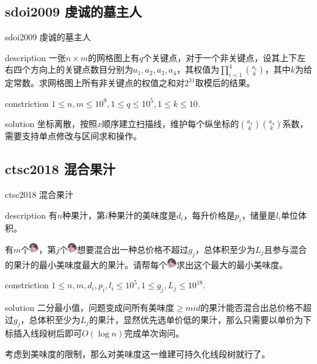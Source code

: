 \documentclass{beamer}
\begin{document}
	\subsection{sdoi2009 虔诚的墓主人}
	\begin{frame}{sdoi2009 虔诚的墓主人}
		\begin{block}{description}
			一张$n\times m$的网格图上有$q$个关键点，对于一个非关键点，设其上下左右四个方向上的关键点数目分别为$a_1,a_2,a_3,a_4$，其权值为$\prod_{i=1}^4\binom{a_i}{k}$，其中$k$为给定常数。求网格图上所有非关键点的权值之和对$2^{31}$取模后的结果。
		\end{block}
		\begin{block}{constriction}
			$1 \le n, m \le 10^9, 1 \le q \le 10^5, 1 \le k \le 10.$
		\end{block}
		\pause
		\begin{block}{solution}
			坐标离散，按照$x$顺序建立扫描线，维护每个纵坐标的$\binom{a_3}{k}\binom{a_4}{k}$系数，需要支持单点修改与区间求和操作。
		\end{block}
	\end{frame}
	\subsection{ctsc2018 混合果汁}
	\begin{frame}{ctsc2018 混合果汁}
		\begin{block}{description}
			有$n$种果汁，第$i$种果汁的美味度是$d_i$，每升价格是$p_i$，储量是$l_i$单位体积。
			
			有$m$个\includegraphics[width=0.4cm]{o_cxk.png}，第$j$个\includegraphics[width=0.4cm]{o_cxk.png}想要混合出一种总价格不超过$g_j$，总体积至少为$L_j$且参与混合的果汁的最小美味度最大的果汁。请帮每个\includegraphics[width=0.4cm]{o_cxk.png}求出这个最大的最小美味度。
		\end{block}
		\begin{block}{constriction}
			$1 \le n, m, d_i, p_i, l_i \le 10^5, 1 \le g_j, L_j \le 10^{18}.$
		\end{block}
		\pause
		\begin{block}{solution}
			二分最小值，问题变成问所有美味度$\ge mid$的果汁能否混合出总价格不超过$g_j$，总体积至少为$L_j$的果汁，显然优先选单价低的果汁，那么只需要以单价为下标插入线段树后即可$O(\log n)$完成单次询问。
			
			考虑到美味度的限制，那么对美味度这一维建可持久化线段树就行了。
		\end{block}
	\end{frame}
\end{document}
